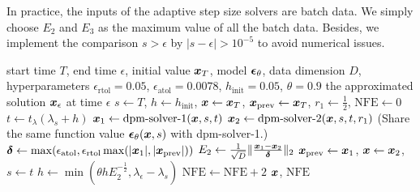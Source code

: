 In practice, the inputs of the adaptive step size solvers are batch data. We simply choose $E_2$ and $E_3$ as the maximum value of all the batch data. Besides, we implement the comparison $s > \epsilon$ by $|s-\epsilon|>10^{-5}$ to avoid numerical issues.

\begin{algorithm}[htbp]
\centering
\caption{(\textbf{DPM-Solver-12}) Adaptive step size algorithm by combining DPM-Solver-1 and 2.}\label{algorithm:dpm_solver_12}
\begin{algorithmic}[1]
\Require start time $T$, end time $\epsilon$, initial value $\bm{x}_T$, model $\bm{\epsilon}_\theta$, data dimension $D$, hyperparameters $\epsilon_{\text{rtol}}=0.05$, $\epsilon_{\text{atol}}=0.0078$, $h_{\text{init}}=0.05$, $\theta=0.9$
\Ensure the approximated solution $\bm{x}_{\epsilon}$ at time $\epsilon$
\State $s\gets T$, $h\gets h_{\text{init}}$, $\bm{x}\gets \bm{x}_T$, $\bm{x}_{\text{prev}}\gets \bm{x}_T$, $r_1\gets \frac{1}{2}$, $\text{NFE}\gets 0$
    \State $t\gets t_{\lambda}(\lambda_s + h)$
    \State $\bm{x}_1\gets \text{dpm-solver-1}(\bm{x}, s, t)$
    \State $\bm{x}_2\gets \text{dpm-solver-2}(\bm{x}, s, t, r_1)$ (Share the same function value $\bm{\epsilon}_\theta(\bm{x}, s)$ with dpm-solver-1.)
    \State $\bm{\delta} \gets \max(\epsilon_{\text{atol}}, \epsilon_{\text{rtol}}\max(|\bm{x}_1|, |\bm{x}_{\text{prev}}|))$
    \State $E_2\gets \frac{1}{\sqrt{D}}\|\frac{\bm{x}_1-\bm{x}_2}{\bm{\delta}}\|_2$
        \State $\bm{x}_{\text{prev}}\gets \bm{x}_1$, $\bm{x}\gets \bm{x}_2$, $s\gets t$
    \EndIf
    \State $h\gets \min(\theta h E_2^{-\frac{1}{2}}, \lambda_{\epsilon} - \lambda_s)$
    \State $\text{NFE}\gets \text{NFE} + 2$
\EndWhile
\State \Return $\bm{x}$, $\text{NFE}$

\end{algorithmic}
\end{algorithm}


